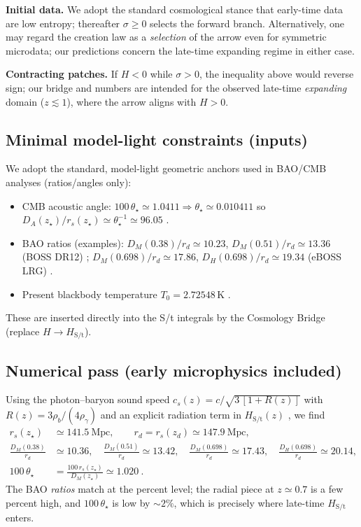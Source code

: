 \documentclass[11pt,oneside]{article}
\begin{document}
\medskip
\noindent\textbf{Initial data.}
We adopt the standard cosmological stance that early-time data are low entropy; thereafter $\sigma\ge 0$ selects the forward branch. Alternatively, one may regard the creation law as a \emph{selection} of the arrow even for symmetric microdata; our predictions concern the late-time expanding regime in either case.

\medskip
\noindent\textbf{Contracting patches.}
If $H<0$ while $\sigma>0$, the inequality above would reverse sign; our bridge and numbers are intended for the observed late-time \emph{expanding} domain ($z\lesssim 1$), where the arrow aligns with $H>0$.

\subsection{Minimal model-light constraints (inputs)}
We adopt the standard, model-light geometric anchors used in BAO/CMB analyses (ratios/angles only):
\begin{itemize}
  \item CMB acoustic angle: $100\,\theta_\star \simeq 1.0411 \Rightarrow \theta_\star\simeq 0.010411$ so $D_A(z_\star)/r_s(z_\star)\simeq \theta_\star^{-1}\simeq 96.05$ \cite{planck2018params}.
  \item BAO ratios (examples): $D_M(0.38)/r_d\simeq 10.23$, $D_M(0.51)/r_d\simeq 13.36$ (BOSS DR12) \cite{alam2017bossdr12};
        $D_M(0.698)/r_d\simeq 17.86$, $D_H(0.698)/r_d\simeq 19.34$ (eBOSS LRG) \cite{bautista2021ebosslrg}.
  \item Present blackbody temperature $T_0=2.72548\,$K \cite{fixsen2009}.
\end{itemize}
These are inserted directly into the S/t integrals by the Cosmology Bridge (replace $H\to H_{\text{S/t}}$).

\subsection{Numerical pass (early microphysics included)}
Using the photon--baryon sound speed $c_s(z)=c/\sqrt{3\,[1+R(z)]}$ with $R(z)=3\rho_b/(4\rho_\gamma)$ and an explicit radiation term in $H_{\text{S/t}}(z)$ \cite{husugiyama1996,eisenstein1998}, we find
\begin{align*}
  r_s(z_\star)&\simeq 141.5~\mathrm{Mpc},\qquad r_d=r_s(z_d)\simeq 147.9~\mathrm{Mpc},\\
  \frac{D_M(0.38)}{r_d}&\simeq 10.36,\quad \frac{D_M(0.51)}{r_d}\simeq 13.42,\quad
  \frac{D_M(0.698)}{r_d}\simeq 17.43,\quad \frac{D_H(0.698)}{r_d}\simeq 20.14,\\
  100\,\theta_\star&=\frac{100\,r_s(z_\star)}{D_M(z_\star)}\simeq 1.020~.
\end{align*}
The BAO \emph{ratios} match at the percent level; the radial piece at $z\simeq0.7$ is a few percent high, and $100\,\theta_\star$ is low by $\sim2\%$, which is precisely where late-time $H_{\text{S/t}}$ enters.
\end{document}
